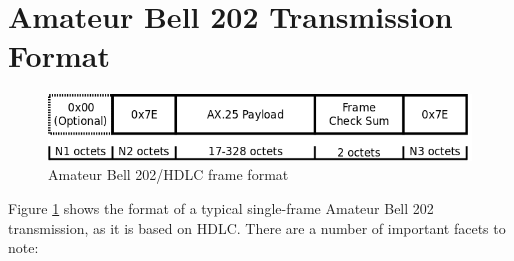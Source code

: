 \section{Amateur Bell 202 Transmission Format}

\begin{figure}
	\centering
	\includegraphics[width=1.0\textwidth]{src/dia/bell202}
	\caption{Amateur Bell 202/HDLC frame format}
	\label{fig:bell202format}
\end{figure}

Figure \ref{fig:bell202format} shows the format of a typical single-frame
Amateur Bell 202 transmission, as it is based on HDLC.
There are a number of important facets to note:
